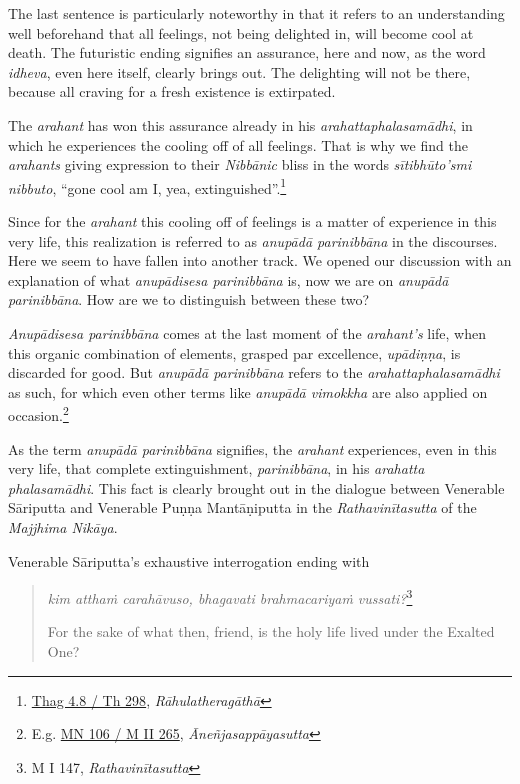 The last sentence is particularly noteworthy in that it refers to an understanding well beforehand that all feelings, not being delighted in, will become cool at death. The futuristic ending signifies an assurance, here and now, as the word \emph{idheva}, even here itself, clearly brings out. The delighting will not be there, because all craving for a fresh existence is extirpated.

The \emph{arahant} has won this assurance already in his \emph{arahattaphalasamādhi}, in which he experiences the cooling off of all feelings. That is why we find the \emph{arahants} giving expression to their \emph{Nibbānic} bliss in the words \emph{sītibhūto'smi nibbuto}, ``gone cool am I, yea, extinguished''.\footnote{\href{https://suttacentral.net/thag4.8/pli/ms}{Thag 4.8 / Th 298}, \emph{Rāhulatheragāthā}}

Since for the \emph{arahant} this cooling off of feelings is a matter of experience in this very life, this realization is referred to as \emph{anupādā parinibbāna} in the discourses. Here we seem to have fallen into another track. We opened our discussion with an explanation of what \emph{anupādisesa parinibbāna} is, now we are on \emph{anupādā parinibbāna}. How are we to distinguish between these two?

\emph{Anupādisesa parinibbāna} comes at the last moment of the \emph{arahant's} life, when this organic combination of elements, grasped par excellence, \emph{upādiṇṇa}, is discarded for good. But \emph{anupādā parinibbāna} refers to the \emph{arahattaphalasamādhi} as such, for which even other terms like \emph{anupādā vimokkha} are also applied on occasion.\footnote{E.g. \href{https://suttacentral.net/mn106/pli/ms}{MN 106 / M II 265}, \emph{Āneñjasappāyasutta}}

As the term \emph{anupādā parinibbāna} signifies, the \emph{arahant} experiences, even in this very life, that complete extinguishment, \emph{parinibbāna}, in his \emph{arahatta phalasamādhi}. This fact is clearly brought out in the dialogue between Venerable Sāriputta and Venerable Puṇṇa Mantāṇiputta in the \emph{Rathavinītasutta} of the \emph{Majjhima Nikāya}.

Venerable Sāriputta's exhaustive interrogation ending with

\begin{quote}
\emph{kim atthaṁ carahāvuso, bhagavati brahmacariyaṁ vussati?}\footnote{M I 147, \emph{Rathavinītasutta}}

For the sake of what then, friend, is the holy life lived under the Exalted One?
\end{quote}


